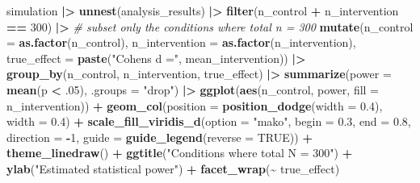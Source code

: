 \documentclass[
]{article}
\newenvironment{Shaded}{\begin{snugshade}}{\end{snugshade}}
\newcommand{\AttributeTok}[1]{\textcolor[rgb]{0.13,0.29,0.53}{#1}}
\newcommand{\CommentTok}[1]{\textcolor[rgb]{0.56,0.35,0.01}{\textit{#1}}}
\newcommand{\ConstantTok}[1]{\textcolor[rgb]{0.56,0.35,0.01}{#1}}
\newcommand{\DecValTok}[1]{\textcolor[rgb]{0.00,0.00,0.81}{#1}}
\newcommand{\FloatTok}[1]{\textcolor[rgb]{0.00,0.00,0.81}{#1}}
\newcommand{\FunctionTok}[1]{\textcolor[rgb]{0.13,0.29,0.53}{\textbf{#1}}}
\newcommand{\NormalTok}[1]{#1}
\newcommand{\SpecialCharTok}[1]{\textcolor[rgb]{0.81,0.36,0.00}{\textbf{#1}}}
\newcommand{\StringTok}[1]{\textcolor[rgb]{0.31,0.60,0.02}{#1}}
\begin{document}
\begin{Shaded}
\begin{Highlighting}[]
\NormalTok{simulation }\SpecialCharTok{|\textgreater{}}
  \FunctionTok{unnest}\NormalTok{(analysis\_results) }\SpecialCharTok{|\textgreater{}}
  \FunctionTok{filter}\NormalTok{(n\_control }\SpecialCharTok{+}\NormalTok{ n\_intervention }\SpecialCharTok{==} \DecValTok{300}\NormalTok{) }\SpecialCharTok{|\textgreater{}} \CommentTok{\# subset only the conditions where total n = 300}
  \FunctionTok{mutate}\NormalTok{(}\AttributeTok{n\_control =} \FunctionTok{as.factor}\NormalTok{(n\_control),}
         \AttributeTok{n\_intervention =} \FunctionTok{as.factor}\NormalTok{(n\_intervention),}
         \AttributeTok{true\_effect =} \FunctionTok{paste}\NormalTok{(}\StringTok{"Cohen\textquotesingle{}s d ="}\NormalTok{, mean\_intervention)) }\SpecialCharTok{|\textgreater{}}
  \FunctionTok{group\_by}\NormalTok{(n\_control,}
\NormalTok{           n\_intervention,}
\NormalTok{           true\_effect) }\SpecialCharTok{|\textgreater{}}
  \FunctionTok{summarize}\NormalTok{(}\AttributeTok{power =} \FunctionTok{mean}\NormalTok{(p }\SpecialCharTok{\textless{}}\NormalTok{ .}\DecValTok{05}\NormalTok{), }\AttributeTok{.groups =} \StringTok{"drop"}\NormalTok{) }\SpecialCharTok{|\textgreater{}}
  \FunctionTok{ggplot}\NormalTok{(}\FunctionTok{aes}\NormalTok{(n\_control, power, }\AttributeTok{fill =}\NormalTok{ n\_intervention)) }\SpecialCharTok{+}
  \FunctionTok{geom\_col}\NormalTok{(}\AttributeTok{position =} \FunctionTok{position\_dodge}\NormalTok{(}\AttributeTok{width =} \FloatTok{0.4}\NormalTok{), }\AttributeTok{width =} \FloatTok{0.4}\NormalTok{) }\SpecialCharTok{+}
  \FunctionTok{scale\_fill\_viridis\_d}\NormalTok{(}\AttributeTok{option =} \StringTok{"mako"}\NormalTok{, }\AttributeTok{begin =} \FloatTok{0.3}\NormalTok{, }\AttributeTok{end =} \FloatTok{0.8}\NormalTok{, }\AttributeTok{direction =} \SpecialCharTok{{-}}\DecValTok{1}\NormalTok{,}
                       \AttributeTok{guide =} \FunctionTok{guide\_legend}\NormalTok{(}\AttributeTok{reverse =} \ConstantTok{TRUE}\NormalTok{)) }\SpecialCharTok{+}
  \FunctionTok{theme\_linedraw}\NormalTok{() }\SpecialCharTok{+}
  \FunctionTok{ggtitle}\NormalTok{(}\StringTok{"Conditions where total N = 300"}\NormalTok{) }\SpecialCharTok{+}
  \FunctionTok{ylab}\NormalTok{(}\StringTok{"Estimated statistical power"}\NormalTok{) }\SpecialCharTok{+}
  \FunctionTok{facet\_wrap}\NormalTok{(}\SpecialCharTok{\textasciitilde{}}\NormalTok{ true\_effect)}
\end{Highlighting}
\end{Shaded}
\end{document}

